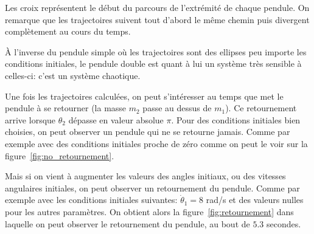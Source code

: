 Les croix représentent le début du parcours de l'extrémité de chaque pendule.
On remarque que les trajectoires suivent tout d'abord le même chemin puis divergent complètement au cours du temps.

À l'inverse du pendule simple où les trajectoires sont des ellipses peu importe les conditions initiales, 
le pendule double est quant à lui un système très sensible à celles-ci: c'est un système chaotique.  

\bigskip

Une fois les trajectoires calculées, on peut s'intéresser au temps que met le pendule à se retourner (la masse $ m_2 $ passe au
dessus de $ m_1 $).
Ce retournement arrive lorsque $ \theta_2 $ dépasse en valeur absolue $ \pi $.
Pour des conditions initiales bien choisies, on peut observer un pendule qui ne se retourne jamais.
Comme par exemple avec des conditions initiales proche de zéro comme on peut le voir sur la figure~\ref{fig:no_retournement}. 

Mais si on vient à augmenter les valeurs des angles initiaux, ou des vitesses angulaires initiales, on peut observer un retournement du pendule.
Comme par exemple avec les conditions initiales suivantes: $ \dot \theta_{1} = 8 $ rad/s et des valeurs nulles pour les autres paramètres.
On obtient alors la figure~\ref{fig:retournement} dans laquelle on peut observer le retournement du pendule, au bout de $5.3$ secondes.


